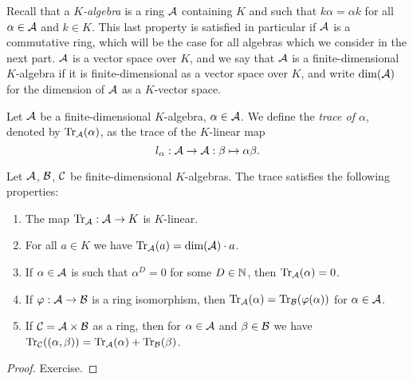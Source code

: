 \documentclass[12pt, leqno, british]{amsart}
\begin{document}
Recall that a \emph{$K$-algebra} is a ring $\mathcal{A}$ containing $K$ and such that $k\alpha = \alpha k$ for all $\alpha \in \mathcal{A}$ and $k \in K$.
This last property is satisfied in particular if $\mathcal{A}$ is a commutative ring, which will be the case for all algebras which we consider in the next part.
$\mathcal{A}$ is a vector space over $K$, and we say that $\mathcal{A}$ is a finite-dimensional $K$-algebra if it is finite-dimensional as a vector space over $K$, and write $\dim(\mathcal{A})$ for the dimension of $\mathcal{A}$ as a $K$-vector space.
\begin{defi}\label{D:trace}
Let $\mathcal{A}$ be a finite-dimensional $K$-algebra, $\alpha \in \mathcal{A}$.
We define the \emph{trace of $\alpha$}, denoted by $\operatorname{Tr}_{\mathcal{A}}(\alpha)$, as the trace of the $K$-linear map
$$ l_\alpha : \mathcal{A} \to \mathcal{A} : \beta \mapsto \alpha \beta.$$
\end{defi}
\begin{prop}\label{P:trace-properties}
Let $\mathcal{A}$, $\mathcal{B}$, $\mathcal{C}$ be finite-dimensional $K$-algebras.
The trace satisfies the following properties:
\begin{enumerate}
\item The map $\operatorname{Tr}_{\mathcal{A}} : \mathcal{A} \to K$ is $K$-linear.
\item For all $a \in K$ we have $\operatorname{Tr}_{\mathcal{A}}(a) = \dim(\mathcal{A}) \cdot a$.
\item\label{it:trace-zero-divisor} If $\alpha \in \mathcal{A}$ is such that $\alpha^D = 0$ for some $D \in \mathbb N$, then $\operatorname{Tr}_{\mathcal{A}}(\alpha) = 0$.
\item\label{it:trace-isomorphism} If $\varphi : \mathcal{A} \to \mathcal{B}$ is a ring isomorphism, then $\operatorname{Tr}_{\mathcal{A}}(\alpha) = \operatorname{Tr}_{\mathcal{B}}(\varphi(\alpha))$ for $\alpha \in \mathcal{A}$.
\item\label{it:trace-product} If $\mathcal{C} = \mathcal{A} \times \mathcal{B}$ as a ring, then for $\alpha \in \mathcal{A}$ and $\beta \in \mathcal{B}$ we have $\operatorname{Tr}_{\mathcal{C}}((\alpha, \beta)) = \operatorname{Tr}_{\mathcal{A}}(\alpha) + \operatorname{Tr}_{\mathcal{B}}(\beta)$.
\end{enumerate}
\end{prop}
\begin{proof}
Exercise.
\end{proof}
\end{document}
